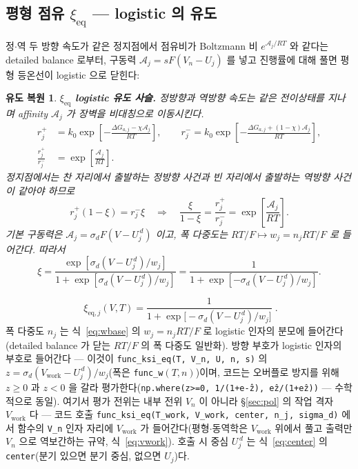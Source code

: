 \documentclass[11pt,a4paper]{article}
\newtheorem*{derivebox}{유도 복원}
\newcommand{\eq}{\mathrm{eq}}
\newcommand{\work}{\mathrm{work}}
\newcommand{\code}[1]{\texttt{#1}}
\begin{document}
\subsection{평형 점유 $\xi_\eq$ — logistic 의 유도}
정$\cdot$역 두 방향 속도가 같은 정지점에서 점유비가 Boltzmann 비 $e^{\mathcal A_j/RT}$ 와 같다는 detailed balance 로부터,
구동력 $\mathcal A_j=sF(V_n-U_j)$ 를 넣고 진행률에 대해 풀면 평형 등온선이 logistic 으로 닫힌다:

\begin{derivebox}
\textbf{$\xi_{\eq}$ logistic 유도 사슬.} 정방향과 역방향 속도는 같은 전이상태를 지나며 affinity $\mathcal A_j$ 가 장벽을 비대칭으로 이동시킨다.
\begin{align*}
r_j^+&=k_0\exp\!\left[-\frac{\Delta G_{a,j}-\chi\mathcal A_j}{RT}\right],\qquad
r_j^-=k_0\exp\!\left[-\frac{\Delta G_{a,j}+(1-\chi)\mathcal A_j}{RT}\right],\\
\frac{r_j^+}{r_j^-}&=\exp\!\left[\frac{\mathcal A_j}{RT}\right].
\end{align*}
정지점에서는 찬 자리에서 출발하는 정방향 사건과 빈 자리에서 출발하는 역방향 사건이 같아야 하므로
\begin{equation*}
r_j^+(1-\xi)=r_j^-\xi
\quad\Longrightarrow\quad
\frac{\xi}{1-\xi}=\frac{r_j^+}{r_j^-}=\exp\!\left[\frac{\mathcal A_j}{RT}\right].
\end{equation*}
기본 구동력은 $\mathcal A_j=\sigma_d F(V-U_j^{\,d})$ 이고, 폭 다중도는 $RT/F\mapsto w_j=n_jRT/F$ 로 들어간다. 따라서
\begin{equation*}
\xi=\frac{\exp[\sigma_d(V-U_j^{\,d})/w_j]}{1+\exp[\sigma_d(V-U_j^{\,d})/w_j]}
=\frac{1}{1+\exp[-\sigma_d(V-U_j^{\,d})/w_j]}.
\end{equation*}
\end{derivebox}

\begin{equation}
\boxed{\;\xi_{\eq,j}(V,T)=\frac{1}{1+\exp\!\big[-\sigma_d(V-U_j^{\,d})/w_j\big]}\;.}
\label{eq:xieq}
\end{equation}
폭 다중도 $n_j$ 는 식~\eqref{eq:wbase} 의 $w_j=n_jRT/F$ 로 logistic 인자의 분모에 들어간다(detailed balance 가 닫는 $RT/F$ 의 폭 다중도 일반화). 방향 부호가 logistic 인자의 부호로 들어간다 — 이것이 \code{func\_ksi\_eq(T, V\_n, U, n, s)} 의
$z=\sigma_d(V_\work-U_j^{\,d})/w_j$(폭은 \code{func\_w}$(T,n)$)이며, 코드는 오버플로 방지를 위해 $z\ge0$ 과 $z<0$ 을
갈라 평가한다(\code{np.where(z>=0, 1/(1+e\^{-z}), e\^{z}/(1+e\^{z}))} — 수학적으로 동일). 여기서 평가 전위는
내부 전위 $V_n$ 이 아니라 \S\ref{sec:pol} 의 작업 격자 $V_\work$ 다 — 코드 호출 \code{func\_ksi\_eq(T\_work,
V\_work, center, n\_j, sigma\_d)} 에서 함수의 \code{V\_n} 인자 자리에 $V_\work$ 가 들어간다(평형$\cdot$동역학은
$V_\work$ 위에서 풀고 출력만 $V_n$ 으로 역보간하는 규약, 식~\eqref{eq:vwork}). 호출 시 중심 $U_j^{\,d}$ 는
식~\eqref{eq:center} 의 \code{center}(분기 있으면 분기 중심, 없으면 $U_j$)다.
\end{document}
